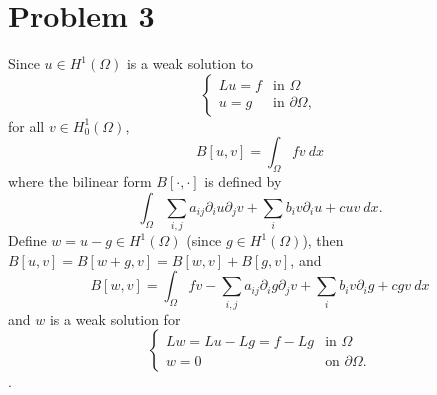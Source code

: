 \documentclass{article}
\begin{document}
\section*{Problem 3}
Since $u\in H^1(\Omega)$ is a weak solution to
\begin{equation*}
\begin{cases}
Lu=f & \text{in }\Omega \\
u=g & \text{in }\partial \Omega,
\end{cases}
\end{equation*}
for all $v\in H^1_0(\Omega)$,
\begin{equation*}
B[u,v]=\int_\Omega fv~dx
\end{equation*}
where the bilinear form $B[\cdot,\cdot]$ is defined by
\begin{equation*}
\int_\Omega \sum\limits_{i,j}a_{ij}\partial_i u \partial _j v + \sum\limits_{i}b_i v \partial_i u+cuv~dx.
\end{equation*}
Define $w=u-g\in H^1(\Omega)$ (since $g\in H^1(\Omega)$), then $B[u,v]=B[w+g, v]=B[w,v]+B[g,v]$, and
\begin{equation*}
B[w,v]=\int_{\Omega} fv- \sum\limits_{i,j}a_{ij}\partial_i g \partial _j v + \sum\limits_{i}b_i v \partial_i g+cgv~dx
\end{equation*}
and $w$ is a weak solution for
\begin{equation*}
\begin{cases}
Lw=Lu-Lg=f-Lg & \text{in }\Omega \\
w=0 & \text{on }\partial \Omega.
\end{cases}
\end{equation*}
.
\end{document}
